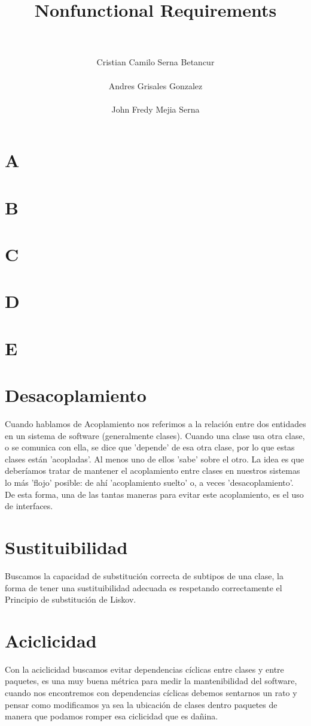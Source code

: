\documentclass[a4paper,11pt]{article}
\title{\LARGE \bf 
    Nonfunctional Requirements
}
\author{\\\\ Cristian Camilo Serna Betancur \\\\ Andres Grisales Gonzalez  
\\\\ John Fredy Mejia Serna}
\begin{document}
\maketitle
\tableofcontents

\section{A}
\section{B}
\section{C}
\section{D}
\section{E}
\section{Desacoplamiento}
Cuando hablamos de Acoplamiento nos referimos a la relación entre dos entidades en un sistema de software (generalmente clases).
Cuando una clase usa otra clase, o se comunica con ella, se dice que 'depende' de esa otra clase, por lo que estas clases están
'acopladas'. Al menos uno de ellos 'sabe' sobre el otro. La idea es que deberíamos tratar de mantener el acoplamiento entre clases
en nuestros sistemas lo más 'flojo' posible: de ahí 'acoplamiento suelto' o, a veces 'desacoplamiento'. De esta forma, una de las
tantas maneras para evitar este acoplamiento, es el uso de interfaces.

\section{Sustituibilidad}
Buscamos la capacidad de substitución correcta de subtipos de una clase, la forma de tener una sustituibilidad
adecuada es respetando correctamente el Principio de substitución de Liskov.

\section{Aciclicidad}
Con la aciclicidad buscamos evitar dependencias cíclicas entre clases y entre paquetes, es una muy buena métrica para medir la mantenibilidad 
del software, cuando nos encontremos con dependencias cíclicas debemos sentarnos un rato y pensar como modificamos ya sea la 
ubicación de clases dentro paquetes de manera que podamos romper esa ciclicidad que es dañina.
\end{document}
